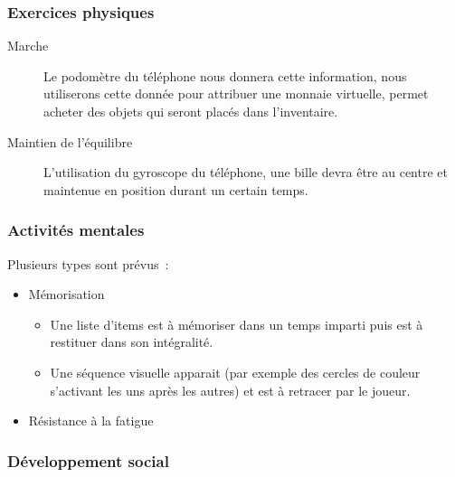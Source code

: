 \documentclass[a4paper,12pt,francais]{article}
\begin{document}
\subsubsection{Exercices physiques}
\begin{description}
    \item[Marche] Le podomètre du téléphone nous donnera cette information, nous utiliserons cette donnée pour attribuer une monnaie virtuelle, permet acheter des objets qui seront placés dans l'inventaire.
    \item[Maintien de l’équilibre] L’utilisation du gyroscope du téléphone, une bille devra être au centre et maintenue en position durant un certain temps.
\end{description}

\subsubsection{Activités mentales}
Plusieurs types sont prévus~:
\begin{itemize}
    \item Mémorisation
        \begin{itemize}
            \item Une liste d’items est à mémoriser dans un temps imparti puis est à restituer dans son intégralité.
            \item Une séquence visuelle apparait (par exemple des cercles de couleur s'activant les uns après les autres) et est à retracer par le joueur.
        \end{itemize}
    \item Résistance à la fatigue
\end{itemize}

\subsubsection{Développement social}
\end{document}
